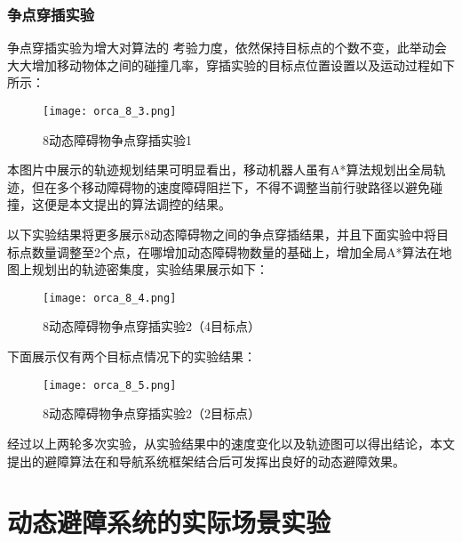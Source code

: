 \subsubsection{争点穿插实验}
争点穿插实验为增大对算法的 考验力度，依然保持目标点的个数不变，此举动会大大增加移动物体之间的碰撞几率，穿插实验的目标点位置设置以及运动过程如下所示：

\begin{figure}[ht]
    \centering
    \texttt{[image: orca\_8\_3.png]}
    \caption{8动态障碍物争点穿插实验1}
\end{figure}
本图片中展示的轨迹规划结果可明显看出，移动机器人虽有A*算法规划出全局轨迹，但在多个移动障碍物的速度障碍阻拦下，不得不调整当前行驶路径以避免碰撞，这便是本文提出的算法调控的结果。

以下实验结果将更多展示8动态障碍物之间的争点穿插结果，并且下面实验中将目标点数量调整至2个点，在哪增加动态障碍物数量的基础上，增加全局A*算法在地图上规划出的轨迹密集度，实验结果展示如下：

\begin{figure}[ht]
    \centering
    \texttt{[image: orca\_8\_4.png]}
    \caption{8动态障碍物争点穿插实验2（4目标点）}
\end{figure}

下面展示仅有两个目标点情况下的实验结果：
\begin{figure}[ht]
    \centering
    \texttt{[image: orca\_8\_5.png]}
    \caption{8动态障碍物争点穿插实验2（2目标点）}
\end{figure}


经过以上两轮多次实验，从实验结果中的速度变化以及轨迹图可以得出结论，本文提出的避障算法在和导航系统框架结合后可发挥出良好的动态避障效果。


\section{动态避障系统的实际场景实验}